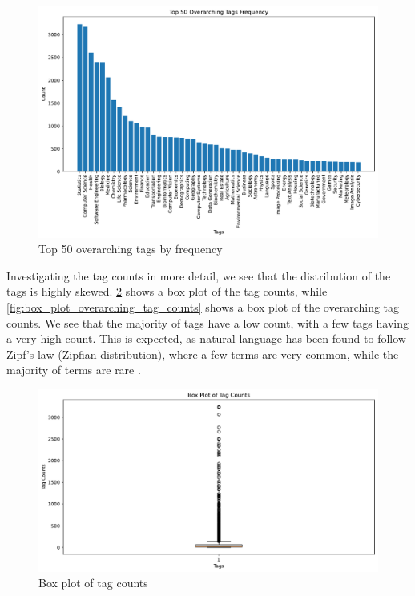 \begin{figure}[h]
    \centering
    \includegraphics[width=\textwidth]{figures/top_50_overarching_frequency.pdf}
    \caption{Top 50 overarching tags by frequency}
    \label{fig:top_50_overarching_frequency}
\end{figure}

Investigating the tag counts in more detail, we see that the distribution of the tags is highly skewed. \cref{fig:box_plot_tag_counts} shows a box plot of the tag counts, while \cref{fig:box_plot_overarching_tag_counts} shows a box plot of the overarching tag counts. We see that the majority of tags have a low count, with a few tags having a very high count. This is expected, as natural language has been found to follow Zipf's law (Zipfian distribution), where a few terms are very common, while the majority of terms are rare \cite{zipf_psycho-biology_1935, piantadosi_zipfs_2014}.

\begin{figure}[h]
    \centering
    \includegraphics[width=\textwidth]{figures/box_plot_tag_counts.pdf}
    \caption{Box plot of tag counts}
    \label{fig:box_plot_tag_counts}
\end{figure}

